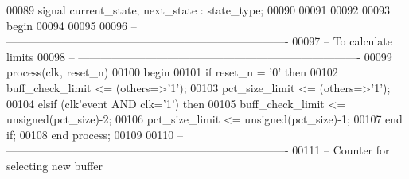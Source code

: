 \begin{DoxyCode}
00089 \textcolor{keywordflow}{signal} \textcolor{vhdlchar}{current_state}\textcolor{vhdlchar}{,} \textcolor{vhdlchar}{next_state} \textcolor{vhdlchar}{:} \textcolor{vhdlchar}{state_type};               
00090 
00091 
00092 
00093 \textcolor{vhdlkeyword}{begin}
00094 
00095 
00096 \textcolor{keyword}{-- ----------------------------------------------------------------------------}
00097 \textcolor{keyword}{-- To calculate limits}
00098 \textcolor{keyword}{-- ----------------------------------------------------------------------------}
00099 \textcolor{keywordflow}{process}(clk, reset_n)
00100 \textcolor{vhdlkeyword}{begin}
00101    \textcolor{keywordflow}{if} \textcolor{vhdlchar}{reset_n} \textcolor{vhdlchar}{=} \textcolor{vhdlchar}{'}\textcolor{vhdllogic}{}\textcolor{vhdllogic}{0}\textcolor{vhdlchar}{'} \textcolor{keywordflow}{then} 
00102       \textcolor{vhdlchar}{buff_check_limit}  \textcolor{vhdlchar}{<=} \textcolor{vhdlchar}{(}\textcolor{keywordflow}{others}\textcolor{vhdlchar}{=}\textcolor{vhdlchar}{>}\textcolor{vhdlchar}{'}\textcolor{vhdllogic}{}\textcolor{vhdllogic}{1}\textcolor{vhdlchar}{'}\textcolor{vhdlchar}{)};
00103       \textcolor{vhdlchar}{pct_size_limit}    \textcolor{vhdlchar}{<=} \textcolor{vhdlchar}{(}\textcolor{keywordflow}{others}\textcolor{vhdlchar}{=}\textcolor{vhdlchar}{>}\textcolor{vhdlchar}{'}\textcolor{vhdllogic}{}\textcolor{vhdllogic}{1}\textcolor{vhdlchar}{'}\textcolor{vhdlchar}{)};
00104    \textcolor{keywordflow}{elsif} \textcolor{vhdlchar}{(}\textcolor{vhdlchar}{clk}\textcolor{vhdlchar}{'}\textcolor{vhdlkeyword}{event} \textcolor{keywordflow}{AND} \textcolor{vhdlchar}{clk}\textcolor{vhdlchar}{=}\textcolor{vhdlchar}{'}\textcolor{vhdllogic}{}\textcolor{vhdllogic}{1}\textcolor{vhdlchar}{'}\textcolor{vhdlchar}{)} \textcolor{keywordflow}{then} 
00105       \textcolor{vhdlchar}{buff_check_limit}  \textcolor{vhdlchar}{<=} \textcolor{comment}{unsigned}\textcolor{vhdlchar}{(}\textcolor{vhdlchar}{pct_size}\textcolor{vhdlchar}{)}\textcolor{vhdlchar}{-}\textcolor{vhdllogic}{}\textcolor{vhdllogic}{2};
00106       \textcolor{vhdlchar}{pct_size_limit}    \textcolor{vhdlchar}{<=} \textcolor{comment}{unsigned}\textcolor{vhdlchar}{(}\textcolor{vhdlchar}{pct_size}\textcolor{vhdlchar}{)}\textcolor{vhdlchar}{-}\textcolor{vhdllogic}{}\textcolor{vhdllogic}{1};
00107    \textcolor{keywordflow}{end} \textcolor{keywordflow}{if};
00108 \textcolor{keywordflow}{end} \textcolor{keywordflow}{process};
00109 
00110 \textcolor{keyword}{-- ----------------------------------------------------------------------------}
00111 \textcolor{keyword}{-- Counter for selecting new buffer}

\end{DoxyCode}
